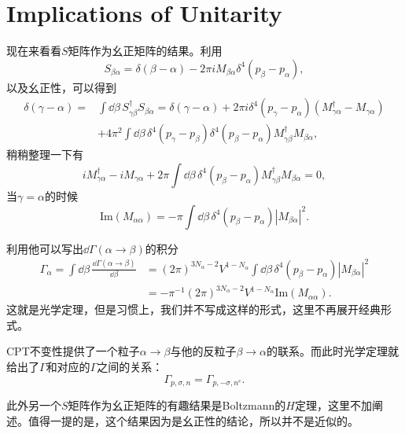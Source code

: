 \section{Implications of Unitarity}
现在来看看$S$矩阵作为幺正矩阵的结果。利用
\[
S_{\beta\alpha}=\delta(\beta-\alpha)-2\pi iM_{\beta\alpha}\delta^4(p_\beta-p_\alpha),
\]
以及幺正性，可以得到
\[
	\begin{split}
	\delta(\gamma-\alpha)=&\int \dd\beta \, S_{\gamma\beta}^\dag S_{\beta\alpha}=\delta(\gamma-\alpha)+2\pi i\delta^4(p_\gamma-p_\alpha)(M^\dag_{\gamma\alpha}-M_{\gamma\alpha})\\
	&+4\pi^2\int\dd\beta \,\delta^4(p_\gamma-p_\beta)\delta^4(p_\beta-p_\alpha)M_{\gamma\beta}^\dag M_{\beta\alpha},
	\end{split}
\]
稍稍整理一下有
\[
	iM^\dag_{\gamma\alpha}-iM_{\gamma\alpha}+2\pi\int\dd\beta \,\delta^4(p_\beta-p_\alpha)M_{\gamma\beta}^\dag M_{\beta\alpha}=0,
\]
当$\gamma=\alpha$的时候
\[
	\mathrm{Im}(M_{\alpha\alpha})=-\pi\int\dd\beta \,\delta^4(p_\beta-p_\alpha) |M_{\beta\alpha}|^2.
\]

利用他可以写出$\dd \Gamma(\alpha\to\beta)$的积分
\[
	\begin{split}
	\Gamma_\alpha=\int \dd\beta\, \frac{\dd \Gamma(\alpha\to\beta)}{\dd\beta}&=(2\pi)^{3N_\alpha-2}V^{1-N_\alpha}\int\dd\beta \,\delta^4(p_\beta-p_\alpha) |M_{\beta\alpha}|^2\\
	&=-\pi^{-1}(2\pi)^{3N_\alpha-2}V^{1-N_\alpha}\mathrm{Im}(M_{\alpha\alpha}).
	\end{split}
\]
这就是光学定理，但是习惯上，我们并不写成这样的形式，这里不再展开经典形式。

CPT不变性提供了一个粒子$\alpha\to\beta$与他的反粒子$\beta\to\alpha$的联系。而此时光学定理就给出了$\Gamma$和对应的$\Gamma$之间的关系：
\[
	\Gamma_{p,\sigma,n}=\Gamma_{p,-\sigma,n^c}.
\]

此外另一个$S$矩阵作为幺正矩阵的有趣结果是Boltzmann的$H$定理，这里不加阐述。值得一提的是，这个结果因为是幺正性的结论，所以并不是近似的。
